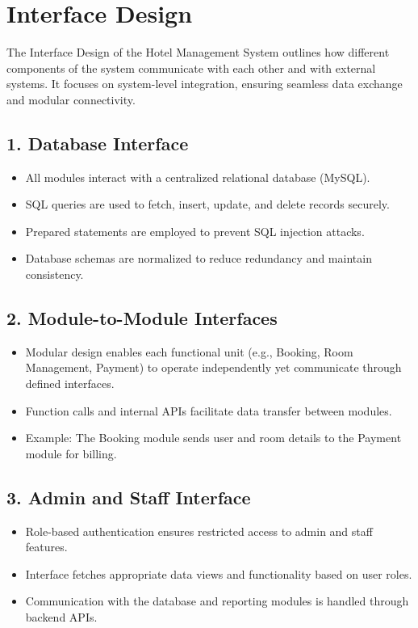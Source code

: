 \documentclass[a4paper,12pt]{article}
\begin{document}
\section{Interface Design}

The Interface Design of the Hotel Management System outlines how different components of the system communicate with each other and with external systems. It focuses on system-level integration, ensuring seamless data exchange and modular connectivity.

\subsection{1. Database Interface}
\begin{itemize}
    \item All modules interact with a centralized relational database (MySQL).
    \item SQL queries are used to fetch, insert, update, and delete records securely.
    \item Prepared statements are employed to prevent SQL injection attacks.
    \item Database schemas are normalized to reduce redundancy and maintain consistency.
\end{itemize}

\subsection{2. Module-to-Module Interfaces}
\begin{itemize}
    \item Modular design enables each functional unit (e.g., Booking, Room Management, Payment) to operate independently yet communicate through defined interfaces.
    \item Function calls and internal APIs facilitate data transfer between modules.
    \item Example: The Booking module sends user and room details to the Payment module for billing.
\end{itemize}

\subsection{3. Admin and Staff Interface}
\begin{itemize}
    \item Role-based authentication ensures restricted access to admin and staff features.
    \item Interface fetches appropriate data views and functionality based on user roles.
    \item Communication with the database and reporting modules is handled through backend APIs.
\end{itemize}
\end{document}
